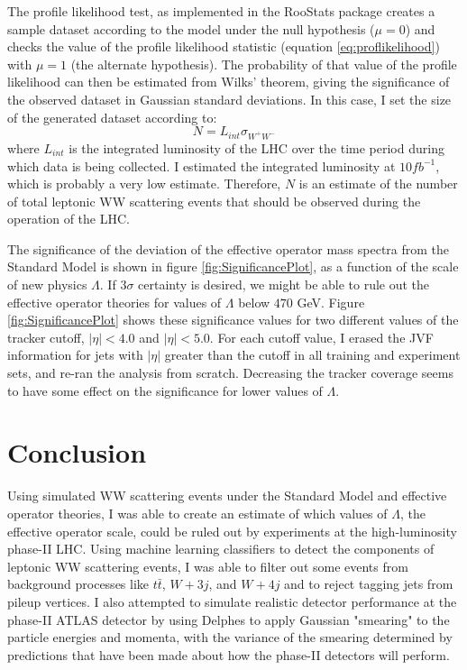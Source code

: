 \documentclass[10pt]{ucscthesisbs}
\begin{document}
The profile likelihood test, as implemented in the RooStats package \cite{roostats} creates a sample dataset according to the model under the null hypothesis ($\mu = 0$) and checks the value of the profile likelihood statistic (equation \ref{eq:proflikelihood}) with $\mu = 1$ (the alternate hypothesis). The probability of that value of the profile likelihood can then be estimated from Wilks' theorem, giving the significance of the observed dataset in Gaussian standard deviations. In this case, I set the size of the generated dataset according to:
\begin{equation}
N = L_{int}\sigma_{W^+W^-}
\end{equation}
where $L_{int}$ is the integrated luminosity of the LHC over the time period during which data is being collected. I estimated the integrated luminosity at $10 fb^{-1}$, which is probably a very low estimate. Therefore, $N$ is an estimate of the number of total leptonic WW scattering events that should be observed during the operation of the LHC. \par
The significance of the deviation of the effective operator mass spectra from the Standard Model is shown in figure \ref{fig:SignificancePlot}, as a function of the scale of new physics $\Lambda$. 
If $3\sigma$ certainty is desired, we might be able to rule out the effective operator theories for values of $\Lambda$ below $470$ GeV. Figure \ref{fig:SignificancePlot} shows these significance values for two different values of the tracker cutoff, $|\eta| < 4.0$ and $|\eta| < 5.0$. For each cutoff value, I erased the JVF information for jets with $|\eta|$ greater than the cutoff in all training and experiment sets, and re-ran the analysis from scratch. Decreasing the tracker coverage seems to have some effect on the significance for lower values of $\Lambda$. 
\chapter{Conclusion}
Using simulated WW scattering events under the Standard Model and effective operator theories, I was able to create an estimate of which values of $\Lambda$, the effective operator scale, could be ruled out by experiments at the high-luminosity phase-II LHC. Using machine learning classifiers to detect the components of leptonic WW scattering events, I was able to filter out some events from background processes like $t\bar{t}$, $W+3j$, and $W+4j$ and to reject tagging jets from pileup vertices. I also attempted to simulate realistic detector performance at the phase-II ATLAS detector by using Delphes to apply Gaussian "smearing" to the particle energies and momenta, with the variance of the smearing determined by predictions that have been made about how the phase-II detectors will perform.  
\appendix
\nocite{*}
\end{document}

